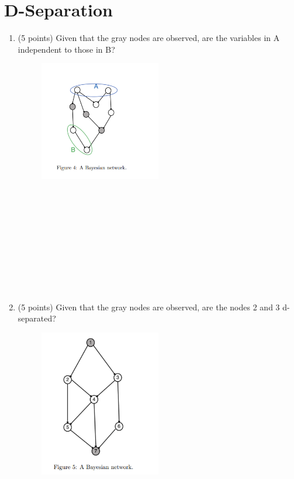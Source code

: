 \documentclass[a3paper,12pt]{extarticle} %
\begin{document}
\section{ D-Separation}
\begin{enumerate}
    \item (5 points) Given that the gray nodes are observed, are the variables in A independent to those in B?
    \begin{figure}[h!]
        \centering
        \includegraphics[width=0.5\textwidth]{dseperation_1.png}
        \label{fig:example_image}
    \end{figure}
    \\\\\\\\\\\\\\\\\\
    \item (5 points) Given that the gray nodes are observed, are the nodes 2 and 3 d-separated?
    \begin{figure}[h!]
        \centering
        \includegraphics[width=0.5\textwidth]{dseperation_2.png}

\end{figure}
\end{enumerate}
\end{document}
